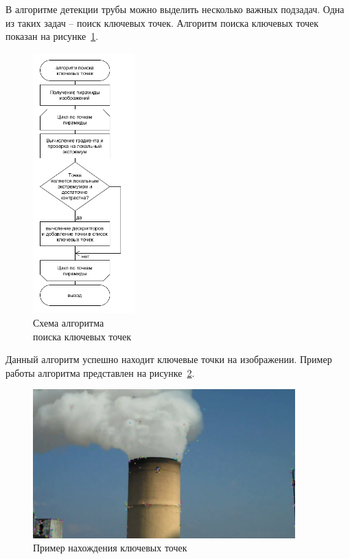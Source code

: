 \documentclass[14pt, a4paper]{extreport}
\begin{document}
	В алгоритме детекции трубы можно выделить несколько важных подзадач. Одна из таких задач -- поиск ключевых точек. Алгоритм поиска ключевых точек показан на рисунке~\ref{fig:trubadetection}.
	\begin{figure}[h!]
		\centering
		\includegraphics[width = 0.35\textwidth]{image/chapter_3/trubadetection}	
		\vspace*{-0.4cm}\caption{Схема алгоритма \\поиска ключевых точек}
		\vspace{0.22cm}
		\label{fig:trubadetection}
	\end{figure}
	
	Данный алгоритм успешно находит ключевые точки на изображении. Пример работы алгоритма представлен на рисунке~\ref{fig:keypoints}.
	\begin{figure}[h!]
		\centering
		\includegraphics[width = 0.9\textwidth]{image/chapter_2/keypoints}	
		\caption{Пример нахождения ключевых точек}
		\label{fig:keypoints}
	\end{figure}
	
\end{document}
